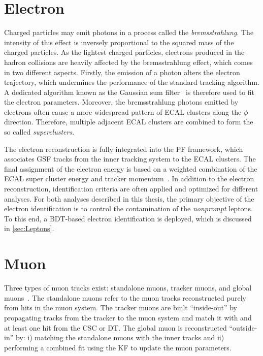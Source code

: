 \section{Electron}
\label{sec:Electron}

Charged particles may emit photons in a process called the \emph{bremsstrahlung}. The intensity of this effect is inversely proportional to the squared mass of the charged particles. As the lightest charged particles, electrons produced in the hadron collisions are heavily affected by the bremsstrahlung effect, which comes in two different aspects. Firstly, the emission of a photon alters the electron trajectory, which undermines the performance of the standard tracking algorithm. A dedicated algorithm known as the Gaussian sum filter~\cite{Adam_2005} is therefore used to fit the electron parameters. Moreover, the bremsstrahlung photons emitted by electrons often cause a more widespread pattern of \ac{ECAL} clusters along the $\phi$ direction. Therefore, multiple adjacent \ac{ECAL} clusters are combined to form the so called \emph{superclusters}.

The electron reconstruction is fully integrated into the \ac{PF} framework, which associates GSF tracks from the inner tracking system to the \ac{ECAL} clusters. The final assignment of the electron energy is based on a weighted combination of the \ac{ECAL} super cluster energy and tracker momentum~\cite{Baffioni:2006cd}. In addition to the electron reconstruction, identification criteria are often applied and optimized for different analyses. For both analyses described in this thesis, the primary objective of the electron identification is to control the contamination of the \emph{nonprompt} leptons. To this end, a \ac{BDT}-based electron identification is deployed, which is discussed in \autoref{sec:Leptons}.

\section{Muon}
\label{sec:Muon}

Three types of muon tracks exist: standalone muons, tracker muons, and global muons~\cite{CMS:2018rym}. The standalone muons refer to the muon tracks reconstructed purely from hits in the muon system. The tracker muons are built ``inside-out'' by propagating tracks from the tracker to the muon system and match it with and at least one hit from the \ac{CSC} or \ac{DT}. The global muon is reconstructed ``outside-in'' by: i) matching the standalone muons with the inner tracks and ii) performing a combined fit using the \ac{KF} to update the muon parameters. 


